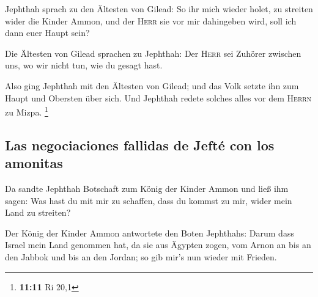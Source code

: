  Jephthah sprach zu den Ältesten von Gilead: So ihr mich
wieder holet, zu streiten wider die Kinder Ammon, und der \textsc{Herr}
sie vor mir dahingeben wird, soll ich dann euer Haupt sein?

 Die Ältesten von Gilead sprachen zu Jephthah: Der
\textsc{Herr} sei Zuhörer zwischen uns, wo wir nicht tun, wie du gesagt
hast.

 Also ging Jephthah mit den Ältesten von Gilead; und das
Volk setzte ihn zum Haupt und Obersten über sich. Und Jephthah redete
solches alles vor dem \textsc{Herrn} zu Mizpa. \footnote{\textbf{11:11}
  Ri 20,1}

\hypertarget{las-negociaciones-fallidas-de-jeftuxe9-con-los-amonitas}{%
\subsection{Las negociaciones fallidas de Jefté con los
amonitas}\label{las-negociaciones-fallidas-de-jeftuxe9-con-los-amonitas}}

 Da sandte Jephthah Botschaft zum König der Kinder Ammon
und ließ ihm sagen: Was hast du mit mir zu schaffen, dass du kommst zu
mir, wider mein Land zu streiten?

 Der König der Kinder Ammon antwortete den Boten
Jephthahs: Darum dass Israel mein Land genommen hat, da sie aus Ägypten
zogen, vom Arnon an bis an den Jabbok und bis an den Jordan; so gib
mir's nun wieder mit Frieden.

